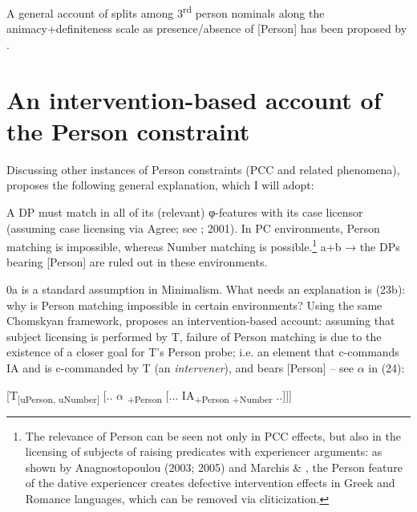 \documentclass[output=paper]{langsci/langscibook}
\begin{document}
A general account of splits among 3\textsuperscript{rd} person nominals along the animacy+definiteness scale as presence/absence of [Person] has been proposed by \citet{Richards2008}.

\section{An intervention-based account of the Person constraint}%

Discussing other instances of Person constraints (PCC and related phenomena), \citet{Rezac2011} proposes the following general explanation, which I will adopt:

\ea\label{ex:guirgea:23}\label{bkm:Ref443240869}
        \ea A DP must match in all of its (relevant) φ-features with its case licensor (assuming case licensing via Agree; see \citealt{Chomsky2000}; 2001).
        \ex In PC environments, Person matching is impossible, whereas Number matching is possible.\footnote{The relevance of Person can be seen not only in PCC effects, but also in the licensing of subjects of raising predicates with experiencer arguments: as shown by Anagnostopoulou (2003; 2005) and Marchis \& \citet{Alexiadou2013}, the Person feature of the dative experiencer creates defective intervention effects in Greek and Romance languages, which can be removed via cliticization.}  
        \ex  a+b → the DPs bearing [Person] are ruled out in these environments.
        \z
\z

0a is a standard assumption in Minimalism. What needs an explanation is (23b): why is Person matching impossible in certain environments? Using the same Chomskyan framework, \citet{Rezac2011} proposes an intervention-based account: assuming that subject licensing is performed by T, failure of Person matching is due to the existence of a closer goal for T’s Person probe; i.e. an element that c-commands IA and is c-commanded by T (an \textit{intervener}), and bears [Person] – see $\alpha $ in (24):

\ea%
    \label{ex:giurgea:24}
    [T\textsubscript{[uPerson, uNumber]}  [.. $\alpha $\textsubscript{ +Person}  [... IA\textsubscript{+Person +Number} ..]]]
\z
\end{document}
